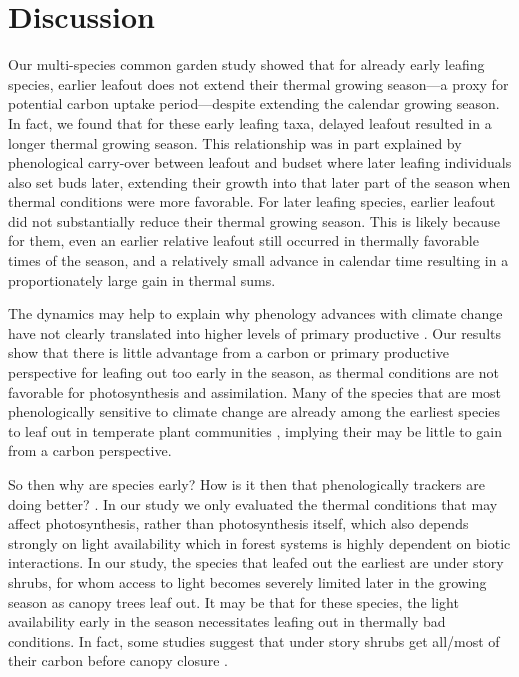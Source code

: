 \documentclass[12 pt]{article}
\begin{document}
\section{Discussion}
Our multi-species common garden study showed that for already early leafing species, earlier leafout does not extend their thermal growing season---a proxy for potential carbon uptake period---despite extending the calendar growing season. In fact, we found that for these early leafing taxa, delayed leafout resulted in a longer thermal growing season. This relationship was in part explained by phenological carry-over between leafout and budset where later leafing individuals also set buds later, extending their growth into that later part of the season when thermal conditions were more favorable.  For later leafing species, earlier leafout did not substantially reduce their thermal growing season. This is likely because for them, even an earlier relative leafout still occurred in thermally favorable times of the season, and a relatively small advance in calendar time resulting in a proportionately large gain in thermal sums.

The dynamics may help to explain why phenology advances with climate change have not clearly translated into higher levels of primary productive \citep{}. Our results show that there is little advantage from a carbon or primary productive perspective for leafing out too early in the season, as thermal conditions are not favorable for photosynthesis and assimilation. Many of the species that are most phenologically sensitive to climate change are already among the earliest species to leaf out in temperate plant communities \citep{}, implying their may be little to gain from a carbon perspective.

So then why are species early? How is it then that phenologically trackers are doing better? \citep{}. In our study we only evaluated the thermal conditions that may affect photosynthesis, rather than photosynthesis itself, which also depends strongly on light availability which in forest systems is highly dependent on biotic interactions. In our study, the species that leafed out the earliest are under story shrubs, for whom access to light becomes severely limited later in the growing season as canopy trees leaf out. It may be that for these species, the light availability early in the season necessitates leafing out in thermally bad conditions. In fact, some studies suggest that under story shrubs get all/most of their carbon before canopy closure \citep{}.
\end{document}
